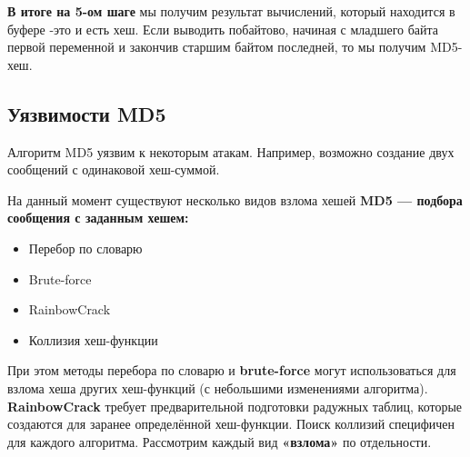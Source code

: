 \documentclass[a4paper,14pt]{report}
\begin{document}
\textbf{В итоге на 5-ом шаге} мы получим результат вычислений, который находится в буфере -это и есть хеш. Если выводить побайтово, начиная с младшего байта первой переменной и закончив старшим байтом последней, то мы получим MD5-хеш. 

\subsection{Уязвимости MD5}
Алгоритм MD5 уязвим к некоторым атакам. Например, возможно создание двух сообщений с одинаковой хеш-суммой.

На данный момент существуют несколько видов взлома хешей \textbf{MD5 — подбора сообщения с заданным хешем:}
\begin{itemize}
  \item Перебор по словарю
  \item Brute-force
  \item RainbowCrack
  \item Коллизия хеш-функции
  \end{itemize}

При этом методы перебора по словарю и \textbf{brute-force} могут использоваться для взлома хеша других хеш-функций (с небольшими изменениями алгоритма). \textbf{RainbowCrack} требует предварительной подготовки радужных таблиц, которые создаются для заранее определённой хеш-функции. Поиск коллизий специфичен для каждого алгоритма. Рассмотрим каждый вид \textbf{«взлома»} по отдельности.
\end{document}
